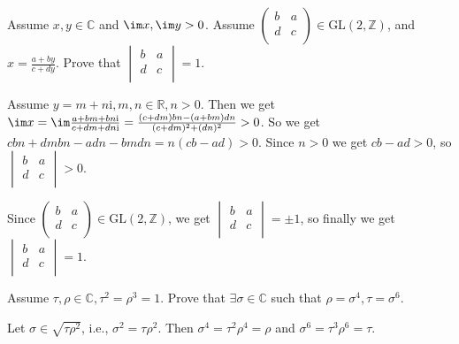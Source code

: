 \documentclass{ctexart}
\newif\ifpreface
\begin{document}
\large
\setlength{\baselineskip}{1.2em}
\ifpreface
    
\newgeometry{left=2cm,right=2cm,top=2cm,bottom=2cm}
\else
{}
\maketitle
\fi
\begin{problem}
  Assume \(x,y \in \mathbb{C}\) and \(\im x,\im y>0\). Assume \(\begin{pmatrix}
  b & a\\
  d & c\\
  \end{pmatrix} \in \text{GL}(2,\mathbb{Z})\), and \(x= \frac{a+by}{c+dy}\). 
  Prove that \(\begin{vmatrix}
  b & a\\
  d & c\\
  \end{vmatrix}=1\). 
\end{problem}
\begin{solution}
  Assume \(y=m+n \mathrm{i},m,n \in \mathbb{R},n>0\). 
  Then we get \(\im x = \im \frac{a+bm+bn \mathrm{i}}{c+dm+dn \mathrm{i}}=\frac{(c+dm)bn-(a+bm)dn}{(c+dm)^2+(dn)^2}>0\). 
  So we get \(cbn+dmbn-adn-bm dn=n(cb-ad)>0\). Since \(n>0\) we get \(cb-ad>0\), so \(\begin{vmatrix}
    b & a\\
    d & c\\
  \end{vmatrix}>0\). 

  Since \(\begin{pmatrix}
    b & a\\
    d & c\\
    \end{pmatrix}\in \text{GL}(2,\mathbb{Z})\), we get \(\begin{vmatrix}
    b & a\\
    d & c\\
    \end{vmatrix}=\pm 1\), so finally we get \(\begin{vmatrix}
    b & a\\
    d & c\\
  \end{vmatrix}=1\). 
\end{solution}

\begin{problem}
  Assume \(\tau,\rho \in \mathbb{C},\tau^2=\rho^3=1\). Prove that \(\exists \sigma \in \mathbb{C}\) such that \(\rho=\sigma^4,\tau=\sigma^6\). 
\end{problem}

\begin{solution}
  Let \(\sigma \in \sqrt{\tau \rho^2}\), i.e., \(\sigma^2=\tau \rho^2\). 
  Then \(\sigma^4=\tau^2 \rho^4=\rho\) and \(\sigma^6=\tau^3\rho^6=\tau \). 
\end{solution}
\end{document}
